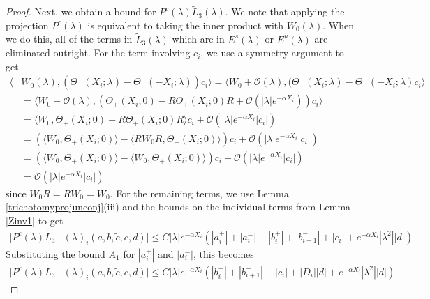 \documentclass[thesis.tex]{subfiles}
\begin{document}
\begin{lemma}
\begin{proof}
Next, we obtain a bound for $P^c(\lambda)\tilde{L}_3(\lambda)$. We note that applying the projection $P^c(\lambda)$ is equivalent to taking the inner product with $W_0(\lambda)$. When we do this, all of the terms in $\tilde{L}_3(\lambda)$ which are in $E^s(\lambda)$ or $E^u(\lambda)$ are eliminated outright. For the term involving $c_i$, we use a symmetry argument to get
\begin{align*}
\langle &W_0(\lambda), (\Theta_+(X_i; \lambda) - \Theta_-(-X_i; \lambda))c_i\rangle = \langle W_0 + \mathcal{O}(\lambda), (\Theta_+(X_i; \lambda) - \Theta_-(-X_i; \lambda) c_i \rangle \\
&= \langle W_0 + \mathcal{O}(\lambda), (\Theta_+(X_i; 0) - R \Theta_+(X_i; 0)R + \mathcal{O}(|\lambda|e^{-\alpha X_i} ))c_i \rangle \\
&= \langle W_0, \Theta_+(X_i; 0) - R \Theta_+(X_i; 0)R \rangle c_i + \mathcal{O}(|\lambda|e^{-\alpha X_i} |c_i|) \\
&= (\langle W_0, \Theta_+(X_i; 0) \rangle - \langle R W_0 R, \Theta_+(X_i; 0) \rangle) c_i + \mathcal{O}(|\lambda|e^{-\alpha X_i} |c_i|) \\
&= (\langle W_0, \Theta_+(X_i; 0) \rangle - \langle W_0, \Theta_+(X_i; 0) \rangle) c_i + \mathcal{O}(|\lambda|e^{-\alpha X_i} |c_i|) \\
&= \mathcal{O}(|\lambda|e^{-\alpha X_i} |c_i|) 
\end{align*}
since $W_0 R = R W_0 = W_0$. For the remaining terms, we use Lemma \ref{trichotomyprojunconj}(iii) and the bounds on the individual terms from Lemma \ref{Zinv1} to get
\begin{align*}
|P^c(\lambda)\tilde{L}_3&(\lambda)_i(a,b,\tilde{c},c,d)| \leq C |\lambda| e^{-\alpha X_i} \left( |a_i^+| + |a_i^-| + |b_i^+| + |b_{i+1}^-| + |c_i| + e^{-\alpha X_i} |\lambda^2| |d| \right)
\end{align*}
Substituting the bound $A_1$ for $|a_i^+|$ and $|a_i^-|$, this becomes
\begin{align*}
|P^c(\lambda)\tilde{L}_3&(\lambda)_i(a,b,\tilde{c},c,d)| \leq C |\lambda| e^{-\alpha X_i} \left( |b_i^+| + |b_{i+1}^-| + |c_i| + |D_i||d| + e^{-\alpha X_i} |\lambda^2| |d| \right)
\end{align*}


\end{proof}
\end{lemma}
\end{document}
